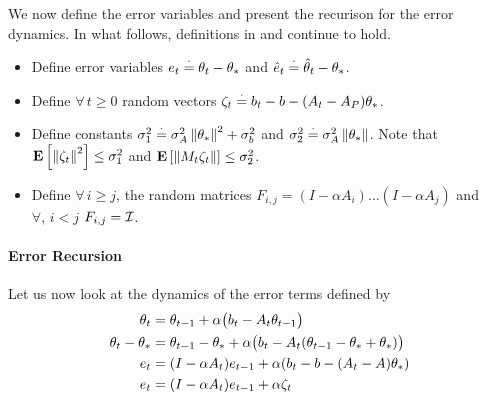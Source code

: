 We now define the error variables and present the recurison for the error dynamics. In what follows, definitions in  and  continue to hold.
\begin{definition}\label{def:err}
\begin{itemize}[leftmargin=*, before = \leavevmode\vspace{-\baselineskip}]
\item Define error variables $e_t\stackrel{\cdot}{=} \theta_t-\theta_*$ and $\hat{e}_t\stackrel{\cdot}{=} \hat{\theta}_t-\theta_*$.
\item Define $\forall\, t\geq 0$ random vectors $\zeta_t\stackrel{\cdot}{=} b_t-b-(A_t-A_P)\theta_*$.
\item Define constants $\sigma_1^2\stackrel{\cdot}{=}\sigma_A^2\left\| \theta_*\right\|^2+\sigma_b^2$ and $\sigma_2^2\stackrel{\cdot}{=}\sigma_A^2\left\| \theta_*\right\|$. Note that $\mathbf{E}\left[\left\| \zeta_t\right\|^2\right]\leq \sigma_1^2$ and $\mathbf{E}\left[\left\| M_t\zeta_t\right\|\right]\leq \sigma_2^2$.
\item Define $\forall\,i\geq j$, the random matrices $F_{i,j}=(I-\alpha A_i)\ldots (I-\alpha A_j)$ and $\forall,\,i<j$ $F_{i,j}=\mathcal{I}$.
\end{itemize}
\end{definition}



\paragraph{Error Recursion} Let us now look at the dynamics of the error terms defined by
\begin{align}\label{eq:errrec}
\begin{split}
\theta_t&=\theta_{t-1}+\alpha\big(b_t-A_t\theta_{t-1}\big)\\
\theta_t-\theta_*&=\theta_{t-1}-\theta_*+\alpha\big(b_t-A_t(\theta_{t-1}-\theta_*+\theta_*)\big)\\
e_t&=(I-\alpha A_t)e_{t-1}+\alpha(b_t -b -(A_t-A)\theta_*)\\
e_t&=(I-\alpha A_t)e_{t-1}+\alpha\zeta_t
\end{split}
\end{align}

